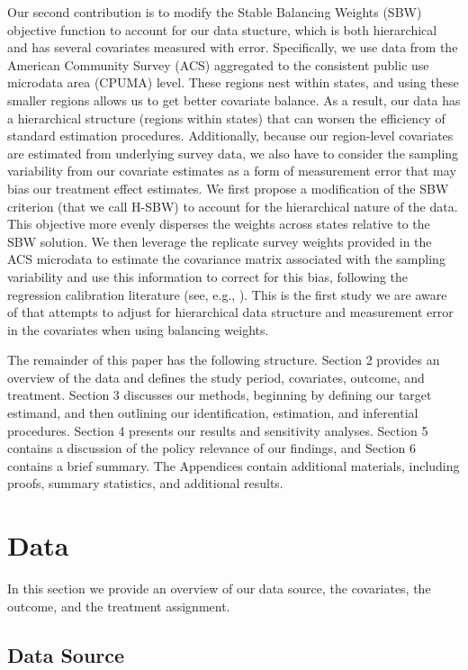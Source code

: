 \documentclass[aoas]{imsart}
\theoremstyle{plain}
\theoremstyle{remark}
\begin{document}
Our second contribution is to modify the Stable Balancing Weights (SBW) objective function to account for our data stucture, which is both hierarchical and has several covariates measured with error. Specifically, we use data from the American Community Survey (ACS) aggregated to the consistent public use microdata area (CPUMA) level. These regions nest within states, and using these smaller regions allows us to get better covariate balance. As a result, our data has a hierarchical structure (regions within states) that can worsen the efficiency of standard estimation procedures. Additionally, because our region-level covariates are estimated from underlying survey data, we also have to consider the sampling variability from our covariate estimates as a form of measurement error that may bias our treatment effect estimates. We first propose a modification of the SBW criterion (that we call H-SBW) to account for the hierarchical nature of the data. This objective more evenly disperses the weights across states relative to the SBW solution. We then leverage the replicate survey weights provided in the ACS microdata to estimate the covariance matrix associated with the sampling variability and use this information to correct for this bias, following the regression calibration literature (see, e.g., \cite{gleser1992importance}). This is the first study we are aware of that attempts to adjust for hierarchical data structure and measurement error in the covariates when using balancing weights. 

The remainder of this paper has the following structure. Section 2 provides an overview of the data and defines the study period, covariates, outcome, and treatment. Section 3 discusses our methods, beginning by defining our target estimand, and then outlining our identification, estimation, and inferential procedures. Section 4 presents our results and sensitivity analyses. Section 5 contains a discussion of the policy relevance of our findings, and Section 6 contains a brief summary. The Appendices contain additional materials, including proofs, summary statistics, and additional results.

\section{Data}

In this section we provide an overview of our data source, the covariates, the outcome, and the treatment assignment.

\subsection{Data Source}
\end{document}
